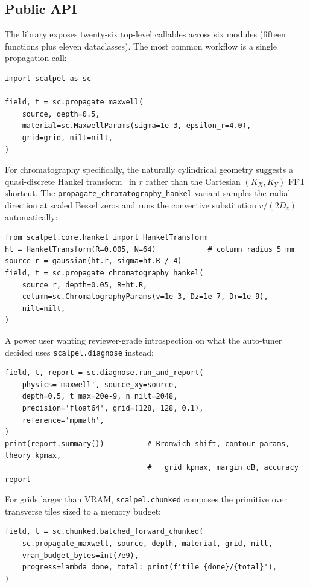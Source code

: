 \documentclass[manuscript,review]{acmart}
\begin{document}
\subsection{Public API}

The library exposes twenty-six top-level callables across six
modules (fifteen functions plus eleven dataclasses). The most
common workflow is a single propagation call:

\begin{lstlisting}[style=pythonstyle]
import scalpel as sc

field, t = sc.propagate_maxwell(
    source, depth=0.5,
    material=sc.MaxwellParams(sigma=1e-3, epsilon_r=4.0),
    grid=grid, nilt=nilt,
)
\end{lstlisting}

For chromatography specifically, the naturally cylindrical geometry
suggests a quasi-discrete Hankel transform~\cite{guizar2004} in $r$
rather than the Cartesian $(K_X, K_Y)$ FFT shortcut. The
\texttt{propagate\_chromatography\_hankel} variant samples the
radial direction at scaled Bessel zeros and runs the convective
substitution $v/(2 D_z)$ automatically:

\begin{lstlisting}[style=pythonstyle]
from scalpel.core.hankel import HankelTransform
ht = HankelTransform(R=0.005, N=64)            # column radius 5 mm
source_r = gaussian(ht.r, sigma=ht.R / 4)
field, t = sc.propagate_chromatography_hankel(
    source_r, depth=0.05, R=ht.R,
    column=sc.ChromatographyParams(v=1e-3, Dz=1e-7, Dr=1e-9),
    nilt=nilt,
)
\end{lstlisting}

A power user wanting reviewer-grade introspection on what the
auto-tuner decided uses \texttt{scalpel.diagnose} instead:

\begin{lstlisting}[style=pythonstyle]
field, t, report = sc.diagnose.run_and_report(
    physics='maxwell', source_xy=source,
    depth=0.5, t_max=20e-9, n_nilt=2048,
    precision='float64', grid=(128, 128, 0.1),
    reference='mpmath',
)
print(report.summary())          # Bromwich shift, contour params, theory kpmax,
                                 #   grid kpmax, margin dB, accuracy report
\end{lstlisting}

For grids larger than VRAM, \texttt{scalpel.chunked} composes the
primitive over transverse tiles sized to a memory budget:

\begin{lstlisting}[style=pythonstyle]
field, t = sc.chunked.batched_forward_chunked(
    sc.propagate_maxwell, source, depth, material, grid, nilt,
    vram_budget_bytes=int(7e9),
    progress=lambda done, total: print(f'tile {done}/{total}'),
)
\end{lstlisting}
\end{document}
